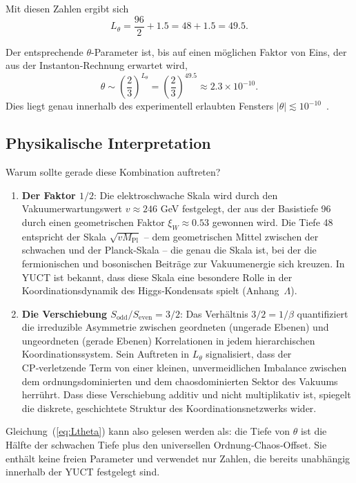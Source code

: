 \documentclass[12pt,a4paper]{article}
\begin{document}
	Mit diesen Zahlen ergibt sich
	\[
	L_\theta = \frac{96}{2} + 1.5 = 48 + 1.5 = 49.5.
	\]
	
	Der entsprechende \(\theta\)-Parameter ist, bis auf einen möglichen Faktor von Eins, der aus der Instanton‑Rechnung erwartet wird,
	\[
	\theta \sim \left(\frac{2}{3}\right)^{L_\theta} = \left(\frac{2}{3}\right)^{49.5} \approx 2.3 \times 10^{-10}.
	\]
	Dies liegt genau innerhalb des experimentell erlaubten Fensters \(|\theta| \lesssim 10^{-10}\)~\cite{nEDM2020}.
	
	\subsection{Physikalische Interpretation}
	
	Warum sollte gerade diese Kombination auftreten?
	\begin{enumerate}
		\item \textbf{Der Faktor \(1/2\)}: Die elektroschwache Skala wird durch den Vakuumerwartungswert \(v \approx 246\) GeV festgelegt, der aus der Basis­tiefe 96 durch einen geometrischen Faktor \(\xi_W \approx 0.53\) gewonnen wird. Die Tiefe 48 entspricht der Skala \(\sqrt{v M_{\mathrm{Pl}}}\) – dem geometrischen Mittel zwischen der schwachen und der Planck‑Skala – die genau die Skala ist, bei der die fermionischen und bosonischen Beiträge zur Vakuumenergie sich kreuzen. In YUCT ist bekannt, dass diese Skala eine besondere Rolle in der Koordinationsdynamik des Higgs‑Kondensats spielt (Anhang~\(\Lambda\)).
		\item \textbf{Die Verschiebung \(S_{\mathrm{odd}}/S_{\mathrm{even}} = 3/2\)}: Das Verhältnis \(3/2 = 1/\beta\) quantifiziert die irreduzible Asymmetrie zwischen geordneten (ungerade Ebenen) und ungeordneten (gerade Ebenen) Korrelationen in jedem hierarchischen Koordinationssystem. Sein Auftreten in \(L_\theta\) signalisiert, dass der CP‑verletzende Term von einer kleinen, unvermeidlichen Imbalance zwischen dem ordnungsdominierten und dem chaosdominierten Sektor des Vakuums herrührt. Dass diese Verschiebung additiv und nicht multiplikativ ist, spiegelt die diskrete, geschichtete Struktur des Koordinationsnetzwerks wider.
	\end{enumerate}
	
	Gleichung~(\ref{eq:Ltheta}) kann also gelesen werden als: die Tiefe von \(\theta\) ist die Hälfte der schwachen Tiefe plus den universellen Ordnung‑Chaos‑Offset. Sie enthält keine freien Parameter und verwendet nur Zahlen, die bereits unabhängig innerhalb der YUCT festgelegt sind.
	
\end{document}
